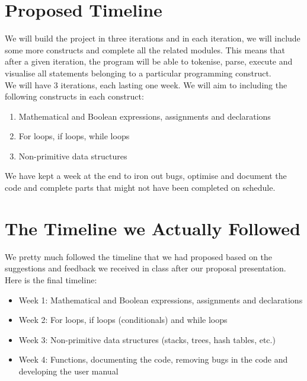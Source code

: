 \documentclass{article}
\begin{document}
\section{Proposed Timeline}
We will build the project in three iterations and in each iteration, we will include some more constructs and complete all the related modules. This means that after a given iteration, the program will be able to tokenise, parse, execute and visualise all statements belonging to a particular programming construct. \\
We will have 3 iterations, each lasting one week. We will aim to including the following constructs in each construct:
\begin{enumerate}
    \item Mathematical and Boolean expressions, assignments and declarations
    \item For loops, if loops, while loops
    \item Non-primitive data structures
\end{enumerate}
We have kept a week at the end to iron out bugs, optimise and document the code and complete parts that might not have been completed on schedule.

\section{The Timeline we Actually Followed}
We pretty much followed the timeline that we had proposed based on the suggestions and feedback we received in class after our proposal presentation. Here is the final timeline:
\begin{itemize}
\item Week 1: Mathematical and Boolean expressions, assignments and declarations
\item Week 2: For loops, if loops (conditionals) and while loops
\item Week 3: Non-primitive data structures (stacks, trees, hash tables, etc.)
\item Week 4: Functions, documenting the code, removing bugs in the code and developing the user manual
\end{itemize}



\end{document}
